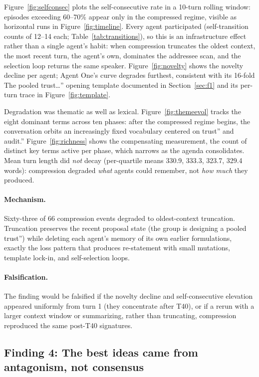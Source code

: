 \documentclass[sigconf,nonacm=true]{acmart}
\begin{document}
Figure~\ref{fig:selfconsec} plots the self-consecutive rate in a 10-turn rolling window: episodes exceeding 60--70\% appear only in the compressed regime, visible as horizontal runs in Figure~\ref{fig:timeline}. Every agent participated (self-transition counts of 12--14 each; Table~\ref{tab:transitions}), so this is an infrastructure effect rather than a single agent's habit: when compression truncates the oldest context, the most recent turn, the agent's own, dominates the addressee scan, and the selection loop returns the same speaker. Figure~\ref{fig:novelty} shows the novelty decline per agent; Agent One's curve degrades furthest, consistent with its 16-fold The pooled trust\ldots'' opening template documented in Section~\ref{sec:f1} and its per-turn trace in Figure~\ref{fig:template}.

Degradation was thematic as well as lexical. Figure~\ref{fig:themeevol} tracks the eight dominant terms across ten phases: after the compressed regime begins, the conversation orbits an increasingly fixed vocabulary centered on trust'' and audit.'' Figure~\ref{fig:richness} shows the compensating measurement, the count of distinct key terms active per phase, which narrows as the agenda consolidates. Mean turn length did \emph{not} decay (per-quartile means 330.9, 333.3, 323.7, 329.4 words): compression degraded \emph{what} agents could remember, not \emph{how much} they produced.

\paragraph{Mechanism.} Sixty-three of 66 compression events degraded to oldest-context truncation. Truncation preserves the recent proposal state (the group is designing a pooled trust'') while deleting each agent's memory of its own earlier formulations, exactly the loss pattern that produces re-statement with small mutations, template lock-in, and self-selection loops.

\paragraph{Falsification.} The finding would be falsified if the novelty decline and self-consecutive elevation appeared uniformly from turn 1 (they concentrate after T40), or if a rerun with a larger context window or summarizing, rather than truncating, compression reproduced the same post-T40 signatures.

\subsection{Finding 4: The best ideas came from antagonism, not consensus}
\label{sec:f4}
\end{document}
